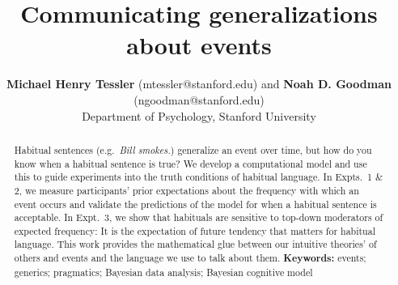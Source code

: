 \documentclass[10pt,letterpaper]{article}
\title{Communicating generalizations about events}
\author{{\large \bf Michael Henry Tessler} (mtessler@stanford.edu) and
 {\large \bf Noah D. Goodman} (ngoodman@stanford.edu) \\
  Department of Psychology, Stanford University}
\newcommand{\ndg}[1]{\textcolor{Green}{[ndg: #1]}}
\begin{document}
\maketitle


\begin{abstract}
Habitual sentences (e.g.~\emph{Bill smokes.}) generalize an event over time, but how do you know when a habitual sentence is true?
We develop a computational model and use this to guide experiments into the truth conditions of habitual language.
In Expts.~1 \& 2, we measure participants' prior expectations about the frequency with which an event occurs and validate the predictions of the model for when a habitual sentence is acceptable.
In Expt.~3, we show that habituals are sensitive to top-down moderators of expected frequency: It is the expectation of future tendency that matters for habitual language.
This work provides the mathematical glue between our intuitive theories' of others and events and the language we use to talk about them.
\textbf{Keywords:} 
events; generics; pragmatics; Bayesian data analysis; Bayesian cognitive model
\end{abstract}
\end{document}
